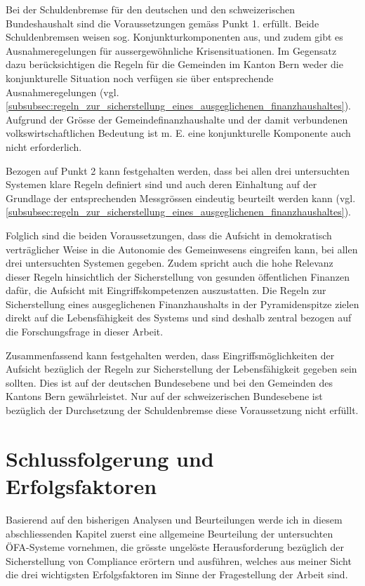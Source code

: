 \documentclass[10pt]{article}
\begin{document}
Bei der Schuldenbremse für den deutschen und den schweizerischen Bundeshaushalt sind die Voraussetzungen gemäss Punkt 1. erfüllt. Beide Schuldenbremsen weisen sog. Konjunkturkomponenten aus, und zudem gibt es Ausnahmeregelungen für ausser­ge­wöhnliche Krisensituationen. Im Gegensatz dazu berücksichtigen die Regeln für die Gemeinden im Kanton Bern weder die konjunkturelle Situation noch verfügen sie über entsprechende Ausnahmeregelungen (vgl. \vref{subsubsec:regeln_zur_sicherstellung_eines_ausgeglichenen_finanzhaushaltes}). Auf­grund der Grösse der Gemeindefinanz­haushalte und der damit verbundenen volkswirtschaftlichen Bedeutung ist m. E. eine konjunkturelle Komponente auch nicht erforderlich.

Bezogen auf Punkt 2 kann festgehalten werden, dass bei allen drei untersuchten Systemen klare Regeln definiert sind und auch deren Einhaltung auf der Grundlage der entsprechenden Messgrössen eindeutig beurteilt werden kann (vgl. \vref{subsubsec:regeln_zur_sicherstellung_eines_ausgeglichenen_finanzhaushaltes}). 

Folglich sind die beiden Voraussetzungen, dass die Aufsicht in demokratisch verträglicher Weise in die Autonomie des Gemeinwesens eingreifen kann, bei allen drei untersuchten Systemen gegeben. Zudem spricht auch die hohe Relevanz dieser Regeln hinsichtlich der Sicherstellung von gesunden öffentlichen Finanzen dafür, die Aufsicht mit Eingriffskompetenzen auszustatten. Die Regeln zur Sicherstellung eines ausgeglichenen Finanzhaushalts in der Pyramiden­spitze zielen direkt auf die Lebensfähigkeit des Systems und sind deshalb zentral bezogen auf die Forschungsfrage in dieser Arbeit.

Zusammenfassend kann festgehalten werden, dass Eingriffsmöglichkeiten der Aufsicht bezüglich der Regeln zur Sicherstellung der Lebensfähigkeit gegeben sein sollten. Dies ist auf der deutschen Bundesebene und bei den Gemeinden des Kantons Bern gewährleistet. Nur auf der schweizerischen Bundesebene ist bezüglich der Durchsetzung der Schuldenbremse diese Voraussetzung nicht erfüllt.

\newpage
\section{Schlussfolgerung und Erfolgsfaktoren}\label{sec:schlussfolgerung_und_erfolgsfaktoren}
Basierend auf den bisherigen Analysen und Beurteilungen werde ich in diesem abschliessenden Kapitel zuerst eine allgemeine Beurteilung der untersuchten ÖFA-Systeme vornehmen, die grösste ungelöste Herausforderung bezüglich der Sicherstellung von Compliance erörtern und ausführen, welches aus meiner Sicht die drei wichtigsten Erfolgsfaktoren im Sinne der Fragestellung der Arbeit sind.
\end{document}
